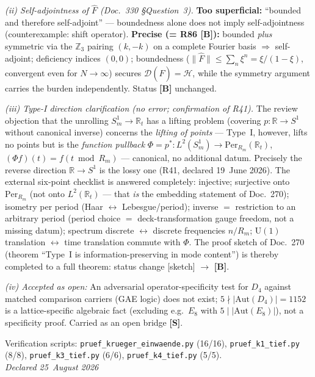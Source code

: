 \emph{(ii) Self-adjointness of $\hat F$ (Doc.~330 §Question~3).}
\textbf{Too superficial:} ``bounded and therefore self-adjoint''
--- boundedness alone does not imply self-adjointness
(counterexample: shift operator).
\textbf{Precise (= R86 \textbf{[B]}):} bounded \emph{plus} symmetric
via the $\mathbb{Z}_3$ pairing $(k,-k)$ on a complete Fourier basis
$\Rightarrow$ self-adjoint; deficiency indices $(0,0)$; boundedness
($\|\hat F\| \le \sum_n \xi^n = \xi/(1-\xi)$, convergent even for
$N\to\infty$) secures $\mathcal{D}(\hat F)=\mathcal{H}$, while the
symmetry argument carries the burden independently.
Status \textbf{[B]} unchanged.

\emph{(iii) Type-I direction clarification (no error; confirmation of R41).}
The review objection that the unrolling $S^1_m \to \mathbb{R}_t$ has a
lifting problem (covering $p:\mathbb{R}\to S^1$ without canonical inverse)
concerns the \emph{lifting of points} --- Type~I, however, lifts no
points but is the \emph{function pullback}
$\Phi = p^*: L^2(S^1_m) \to \mathrm{Per}_{R_m}(\mathbb{R}_t)$,
$(\Phi f)(t) = f(t \bmod R_m)$ --- canonical, no additional datum.
Precisely the reverse direction $\mathbb{R}\to S^1$ is the lossy one
(R41, declared 19~June 2026). The external six-point checklist is
answered completely: injective; surjective onto
$\mathrm{Per}_{R_m}$ (not onto $L^2(\mathbb{R}_t)$ --- that \emph{is}
the embedding statement of Doc.~270); isometry per period
(Haar $\leftrightarrow$ Lebesgue/period); inverse $=$ restriction to
an arbitrary period (period choice $=$ deck-transformation gauge freedom,
not a missing datum); spectrum discrete $\leftrightarrow$ discrete
frequencies $n/R_m$; $\mathrm{U}(1)$ translation $\leftrightarrow$
time translation commute with $\Phi$.
The proof sketch of Doc.~270 (theorem ``Type~I is information-preserving
in mode content'') is thereby completed to a full theorem:
status change [sketch] $\to$ \textbf{[B]}.

\emph{(iv) Accepted as open:} An adversarial operator-specificity test
for $D_4$ against matched comparison carriers (GAE logic) does not exist;
$5 \nmid |\mathrm{Aut}(D_4)| = 1152$ is a lattice-specific algebraic
fact (excluding e.g.\ $E_8$ with $5 \mid |\mathrm{Aut}(E_8)|$),
not a specificity proof. Carried as an open bridge \textbf{[S]}.

Verification scripts: \texttt{pruef\_krueger\_einwaende.py} (16/16),
\texttt{pruef\_k1\_tief.py} (8/8), \texttt{pruef\_k3\_tief.py} (6/6),
\texttt{pruef\_k4\_tief.py} (5/5).\\
\emph{Declared 25~August 2026}

